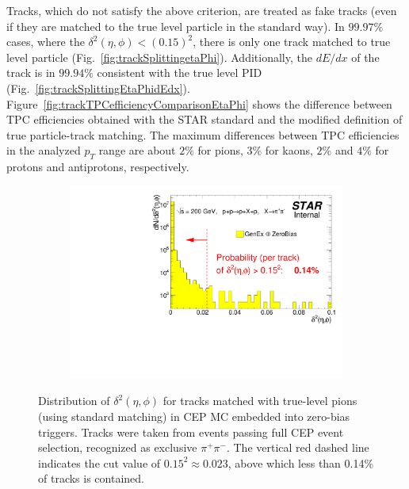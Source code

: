 Tracks, which do not satisfy the above criterion, are treated as fake tracks (even if they are matched to the true level particle in the standard way). In $99.97\%$ cases, where the $\delta^{2}\left(\eta,\phi\right)<\left(0.15\right)^2$, there is only one track matched to true level particle (Fig.~\ref{fig:trackSplittingetaPhi}). Additionally, the $dE/dx$ of the track is in $99.94\%$ consistent with the true level PID (Fig.~\ref{fig:trackSplittingEtaPhidEdx}). Figure~\ref{fig:trackTPCefficiencyComparisonEtaPhi} shows the difference between TPC efficiencies obtained with the STAR standard and the modified definition of true particle-track matching. The maximum differences between TPC efficiencies in the analyzed $p_T$ range are about $2\%$ for pions, $3\%$ for kaons, $2\%$ and $4\%$ for protons and antiprotons, respectively.


\begin{figure}[h!]%
	\centering
	\parbox{0.685\textwidth}{
		\centering
		\begin{subfigure}[b]{\linewidth}
			\includegraphics[width=\linewidth]{graphics/eff/deltaEtaSqDeltaPhiSqMatchedExclusive.pdf}
		\end{subfigure}
	}%
	\quad%
	\parbox{0.285\textwidth}{
		\centering
		\begin{minipage}[t][0.78\linewidth][t]{\linewidth}\vspace{-60pt}
			\caption[Distribution of $\delta^{2}\left(\eta,\phi\right)$ in CEP MC.]%
			{Distribution of $\delta^{2}\left(\eta,\phi\right)$ for tracks matched with true-level pions (using standard matching) in CEP MC embedded into zero-bias triggers. Tracks were taken from events passing full CEP event selection, recognized as exclusive $\pi^{+}\pi^{-}$. The vertical red dashed line indicates the cut value of $0.15^{2} \approx 0.023$, above which less than 0.14\% of tracks is contained.}%
			\label{fig:deltaSqCEP}
		\end{minipage}
	}
\end{figure}


